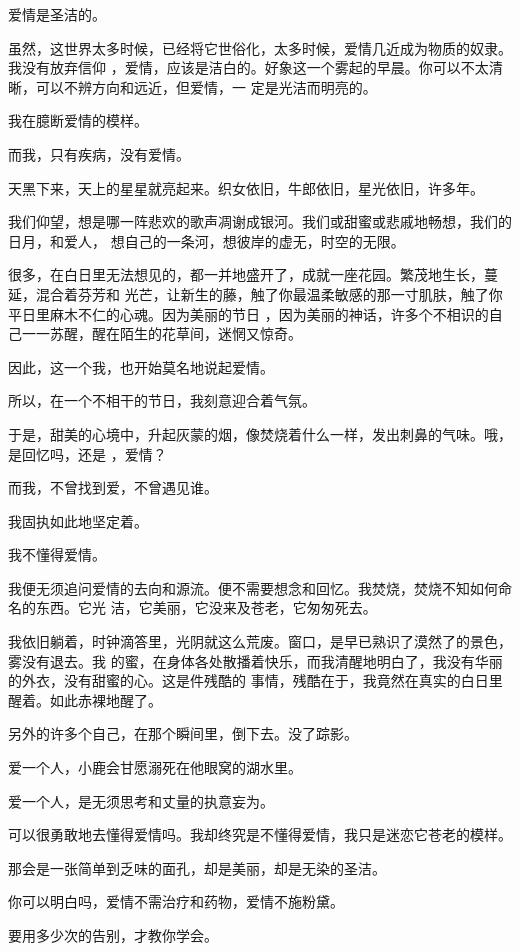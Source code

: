 \documentclass[12pt,a4paper]{article}
\begin{document}
		爱情是圣洁的。

		虽然，这世界太多时候，已经将它世俗化，太多时候，爱情几近成为物质的奴隶。我没有放弃信仰
	，爱情，应该是洁白的。好象这一个雾起的早晨。你可以不太清晰，可以不辨方向和远近，但爱情，一
	定是光洁而明亮的。


		我在臆断爱情的模样。

		而我，只有疾病，没有爱情。


		天黑下来，天上的星星就亮起来。织女依旧，牛郎依旧，星光依旧，许多年。


		我们仰望，想是哪一阵悲欢的歌声凋谢成银河。我们或甜蜜或悲戚地畅想，我们的日月，和爱人，
	想自己的一条河，想彼岸的虚无，时空的无限。

		很多，在白日里无法想见的，都一并地盛开了，成就一座花园。繁茂地生长，蔓延，混合着芬芳和
	光芒，让新生的藤，触了你最温柔敏感的那一寸肌肤，触了你平日里麻木不仁的心魂。因为美丽的节日
	，因为美丽的神话，许多个不相识的自己一一苏醒，醒在陌生的花草间，迷惘又惊奇。

		因此，这一个我，也开始莫名地说起爱情。

		所以，在一个不相干的节日，我刻意迎合着气氛。

		于是，甜美的心境中，升起灰蒙的烟，像焚烧着什么一样，发出刺鼻的气味。哦，是回忆吗，还是
	，爱情？

		而我，不曾找到爱，不曾遇见谁。


		我固执如此地坚定着。

		我不懂得爱情。


		我便无须追问爱情的去向和源流。便不需要想念和回忆。我焚烧，焚烧不知如何命名的东西。它光
	洁，它美丽，它没来及苍老，它匆匆死去。


		我依旧躺着，时钟滴答里，光阴就这么荒废。窗口，是早已熟识了漠然了的景色，雾没有退去。我
	的蜜，在身体各处散播着快乐，而我清醒地明白了，我没有华丽的外衣，没有甜蜜的心。这是件残酷的
	事情，残酷在于，我竟然在真实的白日里醒着。如此赤裸地醒了。


		另外的许多个自己，在那个瞬间里，倒下去。没了踪影。

		爱一个人，小鹿会甘愿溺死在他眼窝的湖水里。

		爱一个人，是无须思考和丈量的执意妄为。

		可以很勇敢地去懂得爱情吗。我却终究是不懂得爱情，我只是迷恋它苍老的模样。

		那会是一张简单到乏味的面孔，却是美丽，却是无染的圣洁。

		你可以明白吗，爱情不需治疗和药物，爱情不施粉黛。

		要用多少次的告别，才教你学会。
\end{document}
